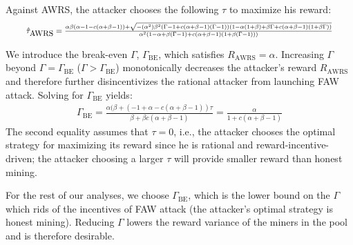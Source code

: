 Against AWRS, the attacker chooses the following $\tau$ to maximize his reward: 
\begin{eqnarray}
\resizebox{.92\hsize}{!}{$
\hat{\tau}_{\mbox{AWRS}}=\frac{\alpha\beta(\alpha-1-c(\alpha+\beta-1))+\sqrt{-(\alpha^2)\beta^2(\Gamma-1+c(\alpha+\beta-1)(\Gamma-1))(1-\alpha(1+\beta)+\beta\Gamma+c(\alpha+\beta-1)(1+\beta\Gamma))}}{\alpha^2(1-\alpha+\beta(\Gamma-1)+c(\alpha+\beta-1)(1+\beta(\Gamma-1)))}
$}
\end{eqnarray}





We introduce the break-even $\Gamma$, $\Gamma_{\mbox{BE}}$, which satisfies $R_{\mbox{AWRS}}=\alpha$.
Increasing $\Gamma$ beyond $\Gamma = \Gamma_{\mbox{BE}}$ ($\Gamma > \Gamma_{\mbox{BE}}$) monotonically decreases the attacker's reward $R_{\mbox{AWRS}}$  %
and therefore further disincentivizes the rational attacker from launching FAW attack.
Solving for $\Gamma_{\mbox{BE}}$ yields:
\begin{eqnarray}
\Gamma_{\mbox{BE}}=\frac{\alpha(\beta+(-1+\alpha-c (\alpha+\beta-1))\tau}{\beta+\beta c(\alpha+\beta-1)}
= \frac{\alpha}{1+ c(\alpha+\beta-1)}
\label{eqn:Gamma_BE}
\end{eqnarray}
The second equality assumes that $\tau=0$, i.e., the attacker chooses the optimal strategy for maximizing its reward since he is rational and reward-incentive-driven;
the attacker choosing a larger $\tau$ will provide smaller reward than honest mining.

For the rest of our analyses, we choose $\Gamma_{\mbox{BE}}$, which is the lower bound on the $\Gamma$ which rids of the incentives of FAW attack (the attacker's optimal strategy is honest mining).
Reducing $\Gamma$ lowers the reward variance of the miners in the pool and is therefore desirable.
